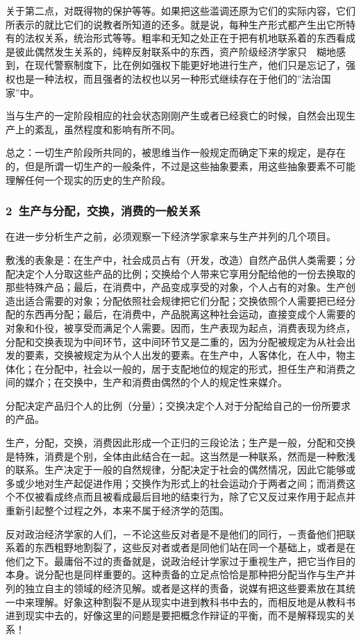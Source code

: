 \documentclass[a4paper,twoside,12pt]{ctexart}
\begin{document}
关于第二点，对既得物的保护等等。如果把这些滥调还原为它们的实际内容，它们所表示的就比它们的说教者所知道的还多。就是说，每种生产形式都产生出它所特有的法权关系，统治形式等等。粗率和无知之处正在于把有机地联系着的东西看成是彼此偶然发生关系的，纯粹反射联系中的东西，资产阶级经济学家只　糊地感到，在现代警察制度下，比在例如强权下能更好地进行生产，他们只是忘记了，强权也是一种法权，而且强者的法权也以另一种形式继续存在于他们的”法治国家”中。

当与生产的一定阶段相应的社会状态刚刚产生或者已经衰亡的时候，自然会出现生产上的紊乱，虽然程度和影响有所不同。

总之：一切生产阶段所共同的，被思维当作一般规定而确定下来的规定，是存在的，但是所谓一切生产的一般条件，不过是这些抽象要素，用这些抽象要素不可能理解任何一个现实的历史的生产阶段。

\subsubsection{2~生产与分配，交换，消费的一般关系}

在进一步分析生产之前，必须观察一下经济学家拿来与生产并列的几个项目。

敷浅的表象是：在生产中，社会成员占有（开发，改造）自然产品供人类需要；分配决定个人分取这些产品的比例；交换给个人带来它享用分配给他的一份去换取的那些特殊产品；最后，在消费中，产品变成享受的对象，个人占有的对象。生产创造出适合需要的对象；分配依照社会规律把它们分配；交换依照个人需要把已经分配的东西再分配；最后，在消费中，产品脱离这种社会运动，直接变成个人需要的对象和仆役，被享受而满足个人需要。因而，生产表现为起点，消费表现为终点，分配和交换表现为中间环节，这中间环节又是二重的，因为分配被规定为从社会出发的要素，交换被规定为从个人出发的要素。在生产中，人客体化，在人中，物主体化；在分配中，社会以一般的，居于支配地位的规定的形式，担任生产和消费之间的媒介；在交换中，生产和消费由偶然的个人的规定性来媒介。

分配决定产品归个人的比例（分量）；交换决定个人对于分配给自己的一份所要求的产品。

生产，分配，交换，消费因此形成一个正归的三段论法；生产是一般，分配和交换是特殊，消费是个别，全体由此结合在一起。这当然是一种联系，然而是一种敷浅的联系。生产决定于一般的自然规律，分配决定于社会的偶然情况，因此它能够或多或少地对生产起促进作用；交换作为形式上的社会运动介于两者之间；而消费这个不仅被看成终点而且被看成最后目地的结束行为，除了它又反过来作用于起点并重新引起整个过程之外，本来不属于经济学的范围。

反对政治经济学家的人们，－不论这些反对者是不是他们的同行，－责备他们把联系着的东西粗野地割裂了，这些反对者或者是同他们站在同一个基础上，或者是在他们之下。最庸俗不过的责备就是，说政治经计学家过于重视生产，把它当作目的本身。说分配也是同样重要的。这种责备的立足点恰恰是那种把分配当作与生产并列的独立自主的领域的经济见解。或者是这样的责备，说媒有把这些要素放在其统一中来理解。好象这种割裂不是从现实中进到教科书中去的，而相反地是从教科书进到现实中去的，好像这里的问题是要把概念作辩证的平衡，而不是解释现实的关系！
\end{document}
